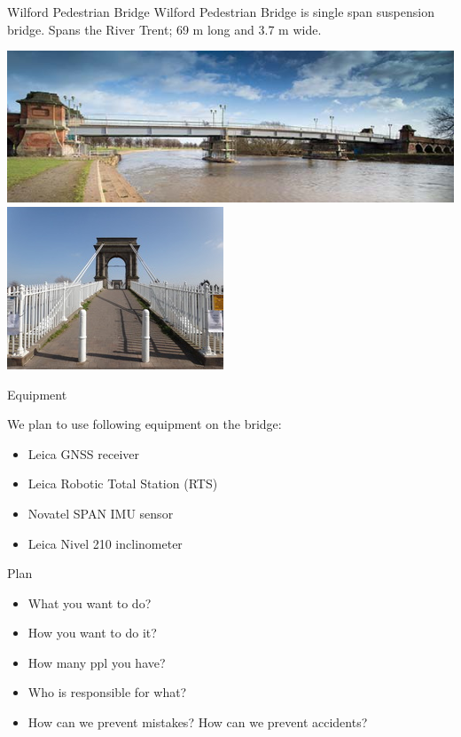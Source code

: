 \documentclass[11pt]{beamer}
\begin{document}
\begin{frame}{Wilford Pedestrian Bridge}
Wilford Pedestrian Bridge is single span suspension bridge. Spans the River Trent; 69 m long and 3.7 m wide.

	\includegraphics[height=.4\textheight]{pic/Bridge01.jpg}
		\centering
	\includegraphics[width=.4\textwidth]{pic/Bridge02.jpg} 

\end{frame}

\begin{frame}{Equipment}

We plan to use following equipment on the bridge:

\begin{itemize}
	\item Leica GNSS receiver
	\item Leica Robotic Total Station (RTS)
	\item Novatel SPAN IMU sensor
	\item Leica Nivel 210 inclinometer
\end{itemize}

\end{frame}

\begin{frame}{Plan}%
\begin{itemize}
	\item What you want to do?
	\item How you want to do it?
	\item How many ppl you have?
	\item Who is responsible for what?
	\item How can we prevent mistakes? How can we prevent accidents?
\end{itemize}
\end{frame}
\end{document}

